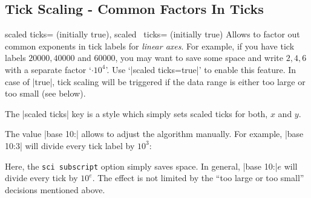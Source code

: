 \subsection{Tick Scaling - Common Factors In Ticks}
\label{sec:scaled:ticks}%
\begin{pgfplotsxykeylist}{
	scaled ticks= (initially true),%
	scaled \x\ ticks= (initially true)%
}
Allows to factor out common exponents in tick labels for \emph{linear axes}. For example, if you have tick labels $20000,40000$ and $60000$, you may want to save some space and write $2,4,6$ with a separate factor `$\cdot 10^4$'. Use `|scaled ticks=true|' to enable this feature. In case of |true|, tick scaling will be triggered if the data range is either too large or too small (see below).
\begin{codeexample}[]
%
\end{codeexample}

\begin{codeexample}[]
\end{codeexample}

	The |scaled ticks| key is a style which simply sets scaled ticks for both, $x$ and $y$.

	The value |base 10:| allows to adjust the algorithm manually. For example, |base 10:3| will divide every tick label by $10^3$:
\begin{codeexample}[]
\end{codeexample}
\noindent Here, the \texttt{sci subscript} option simply saves space.
In general, |base 10:|$e$ will divide every tick by $10^e$. The effect
is not limited by the ``too large or too small'' decisions mentioned
above.


\end{pgfplotsxykeylist}
